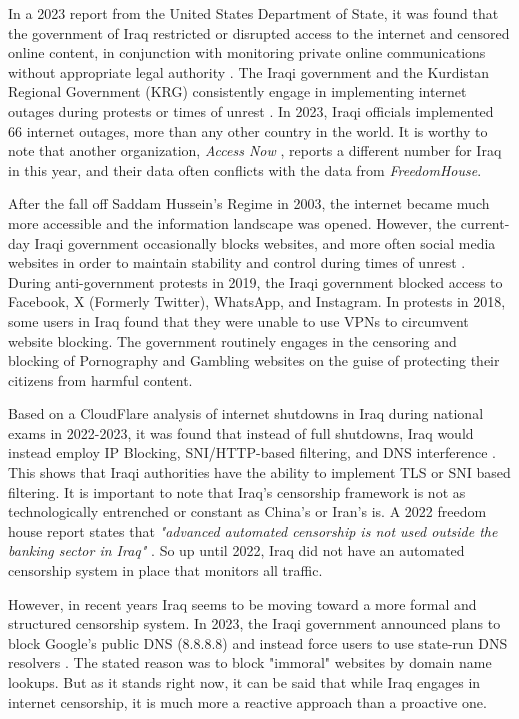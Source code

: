 In a 2023 report from the United States Department of State, it was found that the government of Iraq restricted or disrupted access to the internet and censored online content, in conjunction with monitoring private online communications without appropriate legal authority \cite{USDoSIraq2023}. The Iraqi government and the Kurdistan Regional Government (KRG) consistently engage in implementing internet outages during protests or times of unrest \cite{freedomhouseIraqFreedom}. In 2023, Iraqi officials implemented 66 internet outages, more than any other country in the world. It is worthy to note that another organization, \textit{Access Now} \cite{accessnowBlackoutReport2023}, reports a different number for Iraq in this year, and their data often conflicts with the data from \textit{FreedomHouse}.  

After the fall off Saddam Hussein's Regime in 2003, the internet became much more accessible and the information landscape was opened. However, the current-day Iraqi government occasionally blocks websites, and more often social media websites in order to maintain stability and control during times of unrest \cite{freedomhouseIraqFreedom}. During anti-government protests in 2019, the Iraqi government blocked access to Facebook, X (Formerly Twitter), WhatsApp, and Instagram. In protests in 2018, some users in Iraq found that they were unable to use VPNs to circumvent website blocking. The government routinely engages in the censoring and blocking of Pornography and Gambling websites on the guise of protecting their citizens from harmful content. 

Based on a CloudFlare analysis of internet shutdowns in Iraq during national exams in 2022-2023, it was found that instead of full shutdowns, Iraq would instead employ IP Blocking, SNI/HTTP-based filtering, and DNS interference \cite{CloudFlareIraqExamShutdown}. This shows that Iraqi authorities have the ability to implement TLS or SNI based filtering. It is important to note that Iraq's censorship framework is not as technologically entrenched or constant as China's or Iran's is. A 2022 freedom house report states that \textit{"advanced automated censorship is not used outside the banking sector in Iraq"} \cite{freedomhouseIraqFreedom}. So up until 2022, Iraq did not have an automated censorship system in place that monitors all traffic. 

However, in recent years Iraq seems to be moving toward a more formal and structured censorship system. In 2023, the Iraqi government announced plans to block Google's public DNS (8.8.8.8) and instead force users to use state-run DNS resolvers \cite{smexGooglesDNSIraq}. The stated reason was to block "immoral" websites by domain name lookups. But as it stands right now, it can be said that while Iraq engages in internet censorship, it is much more a reactive approach than a proactive one. 

